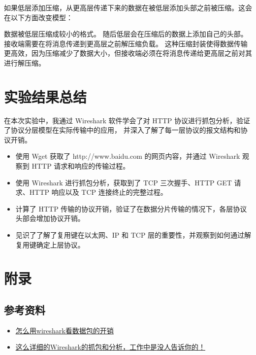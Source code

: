 \documentclass[14pt,a4paper,UTF8,twoside]{article}
\begin{document}
如果低层添加压缩，从更高层传递下来的数据在被低层添加头部之前被压缩。这会在以下方面改变模型：

数据被低层压缩成较小的格式。
随后低层会在压缩后的数据上添加自己的头部。
接收端需要在将消息传递到更高层之前解压缩负载。
这种压缩封装使得数据传输更高效，因为压缩减少了数据大小，但接收端必须在将消息传递给更高层之前对其进行解压缩。

\section{实验结果总结}

在本次实验中，我通过 Wireshark 软件学会了对 HTTP 协议进行抓包分析，验证了协议分层模型在实际传输中的应用，
并深入了解了每一层协议的报文结构和协议开销。

\begin{itemize}
  \item 使用 Wget 获取了 http://www.baidu.com 的网页内容，并通过 Wireshark 观察到 HTTP 请求和响应的传输过程。
  \item 使用 Wireshark 进行抓包分析，获取到了 TCP 三次握手、HTTP GET 请求、HTTP 响应以及 TCP 连接终止的完整过程。
  \item 计算了 HTTP 传输的协议开销，验证了在数据分片传输的情况下，各层协议头部会增加协议开销。
  \item 见识了了解了复用键在以太网、IP 和 TCP 层的重要性，并观察到如何通过解复用键确定上层协议。
\end{itemize}

\section{附录}

\subsection*{参考资料}

\begin{itemize}
  \item \href{https://wenku.csdn.net/answer/ca032a216e634b30890de2bea74f3924}{\underline{怎么用wireshark看数据包的开销}}
  \item \href{https://blog.csdn.net/bigbangbangbang1/article/details/142208991}{\underline{这么详细的Wireshark的抓包和分析，工作中是没人告诉你的！}}
\end{itemize}
\end{document}
